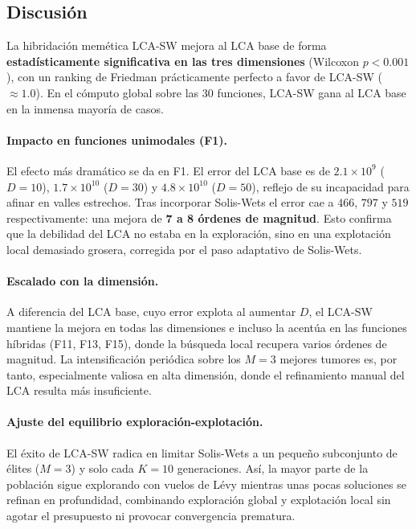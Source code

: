 \subsection{Discusión}

La hibridación memética LCA-SW mejora al LCA base de forma \textbf{estadísticamente
significativa en las tres dimensiones} (Wilcoxon $p < 0.001$), con un ranking de Friedman
prácticamente perfecto a favor de LCA-SW ($\approx 1.0$). En el cómputo global sobre las
30 funciones, LCA-SW gana al LCA base en la inmensa mayoría de casos.

\paragraph{Impacto en funciones unimodales (F1).}
El efecto más dramático se da en F1. El error del LCA base es de $2.1\times 10^9$ ($D=10$),
$1.7\times 10^{10}$ ($D=30$) y $4.8\times 10^{10}$ ($D=50$), reflejo de su incapacidad para
afinar en valles estrechos. Tras incorporar Solis-Wets el error cae a $466$, $797$ y $519$
respectivamente: una mejora de \textbf{7 a 8 órdenes de magnitud}. Esto confirma que la
debilidad del LCA no estaba en la exploración, sino en una explotación local demasiado
grosera, corregida por el paso adaptativo de Solis-Wets.

\paragraph{Escalado con la dimensión.}
A diferencia del LCA base, cuyo error explota al aumentar $D$, el LCA-SW mantiene la mejora
en todas las dimensiones e incluso la acentúa en las funciones híbridas (F11, F13, F15),
donde la búsqueda local recupera varios órdenes de magnitud. La intensificación periódica
sobre los $M=3$ mejores tumores es, por tanto, especialmente valiosa en alta dimensión, donde
el refinamiento manual del LCA resulta más insuficiente.

\paragraph{Ajuste del equilibrio exploración-explotación.}
El éxito de LCA-SW radica en limitar Solis-Wets a un pequeño subconjunto de élites
($M=3$) y solo cada $K=10$ generaciones. Así, la mayor parte de la población sigue
explorando con vuelos de Lévy mientras unas pocas soluciones se refinan en profundidad,
combinando exploración global y explotación local sin agotar el presupuesto ni provocar
convergencia prematura.
